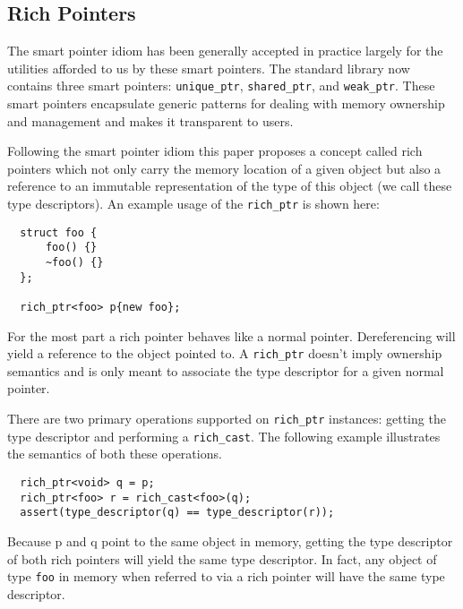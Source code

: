 \subsection{Rich Pointers}

The smart pointer idiom has been generally accepted in practice largely for
the utilities afforded to us by these smart pointers. The standard library now
contains three smart pointers: \verb+unique_ptr+, \verb+shared_ptr+, and
\verb+weak_ptr+. These smart pointers encapsulate generic patterns for dealing
with memory ownership and management and makes it transparent to users.

Following the smart pointer idiom this paper proposes a concept called rich
pointers which not only carry the memory location of a given object but also a
reference to an immutable representation of the type of this object (we call
these type descriptors). An example usage of the \verb+rich_ptr+ is shown
here:

\begin{verbatim}
  struct foo {
      foo() {}
      ~foo() {}
  };

  rich_ptr<foo> p{new foo};
\end{verbatim}

For the most part a rich pointer behaves like a normal pointer. Dereferencing
will yield a reference to the object pointed to. A \verb+rich_ptr+ doesn't
imply ownership semantics and is only meant to associate the type descriptor
for a given normal pointer.

There are two primary operations supported on \verb+rich_ptr+ instances:
getting the type descriptor and performing a \verb+rich_cast+. The following
example illustrates the semantics of both these operations.

\begin{verbatim}
  rich_ptr<void> q = p;
  rich_ptr<foo> r = rich_cast<foo>(q);
  assert(type_descriptor(q) == type_descriptor(r));
\end{verbatim}

Because p and q point to the same object in memory, getting the type
descriptor of both rich pointers will yield the same type descriptor. In fact,
any object of type \verb+foo+ in memory when referred to via a rich pointer
will have the same type descriptor.